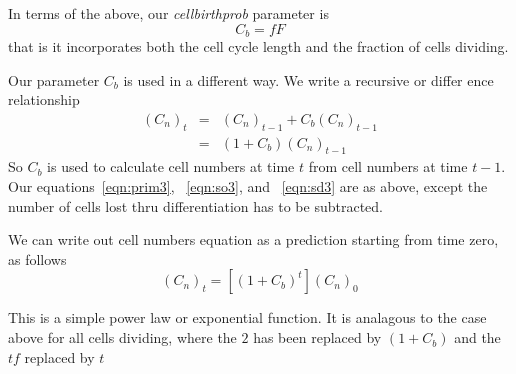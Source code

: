 \documentclass[titlepage]{article}  %
\begin{document}
In terms of the above, our {\em cellbirthprob} parameter is
\begin{displaymath}
C_{b} = f F
\end{displaymath}
that is it incorporates both the cell cycle length and the fraction of cells dividing.

Our parameter $C_{b}$ is used in a different way. We write a recursive or differ
ence relationship
\begin{eqnarray*}
(C_{n})_{t} & = & (C_{n})_{t-1} + C_{b} (C_{n})_{t-1} \\
           & = & (1 +  C_{b})(C_{n})_{t-1}
\end{eqnarray*}
So $C_{b}$ is used to calculate cell numbers at time $t$ from cell numbers at time $t-1$.  Our equations~\ref{eqn:prim3}, ~\ref{eqn:so3}, and ~\ref{eqn:sd3} are as above, except the number of cells lost thru differentiation has to be subtracted. 

We can write out cell numbers equation as a prediction starting from time zero, as follows
\begin{displaymath}
(C_{n})_{t} = \left[(1 +  C_{b})^t\right] (C_{n})_{0}
\end{displaymath}

This is a simple power law or exponential function. It is analagous to the case above for all cells dividing, where the $2$ has been replaced by $(1+C_{b})$ and the $tf$ replaced by $t$
\end{document}
